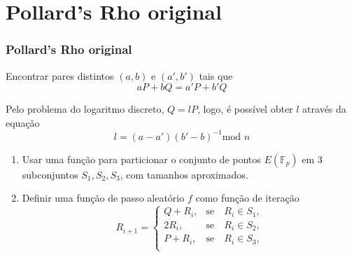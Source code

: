 \documentclass{beamer}
\newcounter{saveenumi}
\newcommand{\seti}{\setcounter{saveenumi}{\value{enumi}}}
\begin{document}

%
%

\section{Pollard's Rho original}
\begin{frame}
\frametitle{Pollard's Rho original}
Encontrar pares distintos $(a,b)$ e $(a',b')$ tais que
$$aP + bQ = a'P + b'Q$$

Pelo problema do logaritmo discreto, $Q = lP$, logo, é possível obter $l$ através da equação
$$l = (a - a')(b' - b)^{-1} \mbox{mod }n$$
\end{frame}
\begin{frame}
  \begin{enumerate}
    \item Usar uma função para particionar o conjunto de pontos $E(\mathbb{F}_p)$ em 3 subconjuntos $S_1, S_2, S_3$, com tamanhos aproximados.
    \item Definir uma função de passo aleatório $f$ como função de iteração
    $$
      R_{i+1}=\left\{\begin{array}{rc}
      Q + R_i,&\mbox{se}\quad R_i \in S_1,\\
      2R_i,&\mbox{se}\quad R_i \in S_2,\\
      P + R_i,&\mbox{se}\quad R_i \in S_3,\\
      \end{array}\right.
    $$ 
    \seti
  \end{enumerate}
\end{frame}
\end{document}
